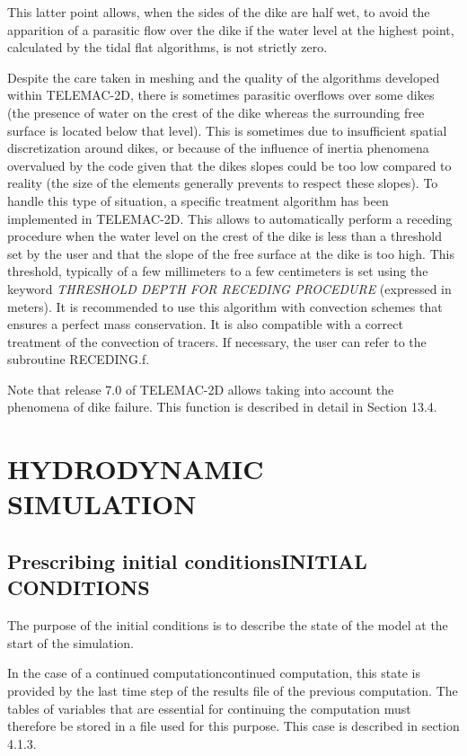 \documentclass{article} %
\begin{document}
 This latter point allows, when the sides of the dike are half wet, to avoid the apparition of a parasitic flow over the dike if the water level at the highest point, calculated by the tidal flat algorithms, is not strictly zero.

 Despite the care taken in meshing and the quality of the algorithms developed within TELEMAC-2D, there is sometimes parasitic overflows over some dikes (the presence of water on the crest of the dike whereas the surrounding free surface is located below that level). This is sometimes due to insufficient spatial discretization around dikes, or because of the influence of inertia phenomena overvalued by the code given that the dikes slopes could be too low compared to reality (the size of the elements generally prevents to respect these slopes). To handle this type of situation, a specific treatment algorithm has been implemented in TELEMAC-2D. This allows to automatically perform a receding procedure when the water level on the crest of the dike is less than a threshold set by the user and that the slope of the free surface at the dike is too high. This threshold, typically of a few millimeters to a few centimeters is set using the keyword \textit{THRESHOLD DEPTH FOR RECEDING PROCEDURE} (expressed in meters). It is recommended to use this algorithm with  convection schemes that ensures a perfect mass conservation. It is also compatible with a correct treatment of the convection of tracers. If necessary, the user can refer to the subroutine RECEDING.f.

 Note that release 7.0 of TELEMAC-2D allows taking into account the phenomena of dike failure. This function is described in detail in Section 13.4.




\section{  HYDRODYNAMIC SIMULATION}


\subsection{ Prescribing initial conditionsINITIAL CONDITIONS}

 The purpose of the initial conditions is to describe the state of the model at the start of the simulation.

 In the case of a continued computationcontinued computation, this state is provided by the last time step of the results file of the previous computation. The tables of variables that are essential for continuing the computation must therefore be stored in a file used for this purpose. This case is described in section 4.1.3.
\end{document}
